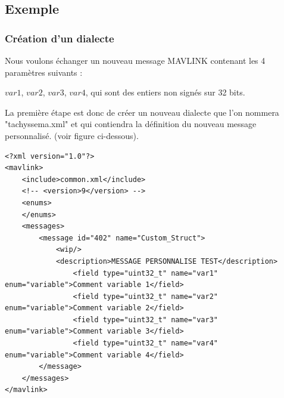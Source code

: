 \subsection{Exemple}
\subsubsection{Création d'un dialecte}
Nous voulons échanger un nouveau message MAVLINK contenant les 4 paramètres suivants :
\begin{flushleft}
	$var1$, $var2$, $var3$, $var4$, qui sont des entiers non signés sur 32 bits.
\end{flushleft}

La première étape est donc de créer un nouveau dialecte que l'on nommera "tachyssema.xml" et qui contiendra la définition du nouveau message personnalisé. (voir figure ci-dessous).
\lstset{style=XML_Style}
\begin{lstlisting}[caption={Nouveau dialecte},captionpos=b, label={lst:custom_dialect_def}]
<?xml version="1.0"?>
<mavlink>
	<include>common.xml</include>
	<!-- <version>9</version> -->
	<enums>
	</enums>
	<messages>
		<message id="402" name="Custom_Struct">
			<wip/>
			<description>MESSAGE PERSONNALISE TEST</description>
				<field type="uint32_t" name="var1" enum="variable">Comment variable 1</field>
				<field type="uint32_t" name="var2" enum="variable">Comment variable 2</field>
				<field type="uint32_t" name="var3" enum="variable">Comment variable 3</field>
				<field type="uint32_t" name="var4" enum="variable">Comment variable 4</field>
		</message>
	</messages>
</mavlink>
\end{lstlisting}
